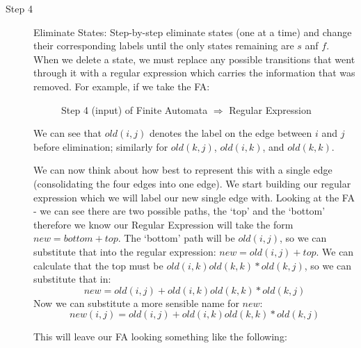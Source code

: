 \begin{description}
\item[Step 4] Eliminate States: Step-by-step eliminate states (one at a time) and change their corresponding labels until the only states remaining are $s$ anf $f$. When we delete a state, we must replace any possible transitions that went through it with a regular expression which carries the information that was removed. For example, if we take the FA:

\begin{figure}[H]
    \centering
    \caption{Step 4 (input) of Finite Automata $\Rightarrow$ Regular Expression}
    \label{fig:fa-to-regex-step4a}
\end{figure}

We can see that $old(i,j)$ denotes the label on the edge between $i$ and $j$ before elimination; similarly for $old(k,j)$, $old(i,k)$, and $old(k,k)$. 

We can now think about how best to represent this with a single edge (consolidating the four edges into one edge). We start building our regular expression which we will label our new single edge with. Looking at the FA - we can see there are two possible paths, the `top' and the `bottom' therefore we know our Regular Expression will take the form $new = bottom + top$. The `bottom' path will be $old(i,j)$, so we can substitute that into the regular expression: $new = old(i,j) + top$. We can calculate that the top must be $old(i,k)old(k,k)*old(k,j)$, so we can substitute that in:
\[new = old(i,j) + old(i,k)old(k,k)*old(k,j) \]
Now we can substitute a more sensible name for $new$:
\[new(i,j) = old(i,j) + old(i,k)old(k,k)*old(k,j) \]

This will leave our FA looking something like the following:

\begin{figure}[H]
    \centering
\end{figure}
\end{description}
